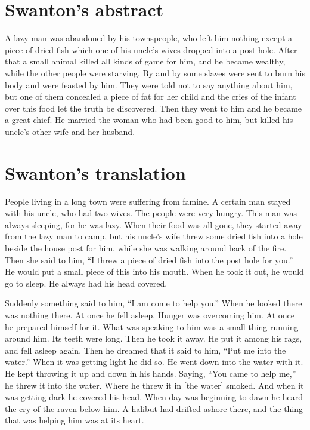 \vspace{1\baselineskip}

\section{Swanton’s abstract}\label{sec:90-swanton-abstract}

A lazy man was abandoned by his townspeople, who left him nothing except a piece of dried fish which one of his uncle’s wives dropped into a post hole.
After that a small animal killed all kinds of game for him, and he became wealthy, while the other people were starving.
By and by some slaves were sent to burn his body and were feasted by him.
They were told not to say anything about him, but one of them concealed a piece of fat for her child and the cries of the infant over this food let the truth be discovered.
Then they went to him and he became a great chief.
He married the woman who had been good to him, but killed his uncle’s other wife and her husband.

\section{Swanton’s translation}\label{sec:90-swanton-translation}

People living in a long town were suffering from famine.
A certain man stayed with his uncle, who had two wives.
The people were very hungry.
This man was always sleeping, for he was lazy.
When their food was all gone, they started away from the lazy man to camp, but his uncle’s wife threw some dried fish into a hole beside the house post for him, while she was walking around back of the fire.
Then she said to him, \qqk{}“I threw a piece of dried fish into the post hole for you.” He would put a small piece of this into his mouth.
When he took it out, he would go to sleep.
He always had his head covered.

Suddenly something said to him, \qqk{}“I am come to help you.” When he looked there was nothing there.
At once he fell asleep.
Hunger was overcoming him.
At once he prepared himself for it.
What was speaking to him was a small thing running around him.
Its teeth were long.
Then he took it away.
He put it among his rags, and fell asleep again.
Then he dreamed that it said to him, “Put me into the water.” When it was getting light he did so.
He went down into the water with it.
He kept throwing it up and down in his hands.
Saying, “You came to help me,” he threw it into the water.
Where he threw it in [the water] smoked.
And when it was getting dark he covered his head.
When day was beginning to dawn he heard the cry of the raven below him.
A halibut had drifted ashore there, and the thing that was helping him was at its heart.

